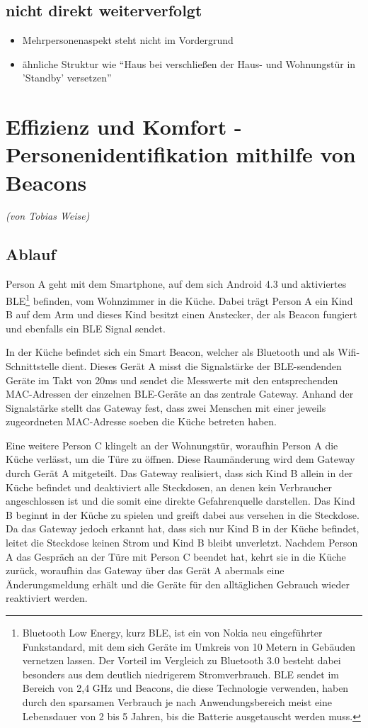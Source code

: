 \subsection{nicht direkt weiterverfolgt}
\begin{itemize}
	\item Mehrpersonenaspekt steht nicht im Vordergrund
	\item ähnliche Struktur wie "`Haus bei verschließen der Haus- und Wohnungstür in 'Standby' versetzen"'
\end{itemize}


\section{Effizienz und Komfort - Personenidentifikation mithilfe von Beacons}
\emph{(von Tobias Weise)}

\subsection{Ablauf}
Person A geht mit dem Smartphone, auf dem sich Android 4.3 und aktiviertes BLE\footnote{
	Bluetooth Low Energy, kurz BLE, ist ein von Nokia neu eingeführter Funkstandard, mit dem sich Geräte im Umkreis von 10 Metern in Gebäuden vernetzen lassen. Der Vorteil im Vergleich zu Bluetooth 3.0 besteht dabei besonders aus dem deutlich niedrigerem Stromverbrauch. BLE sendet im Bereich von 2,4 GHz und Beacons, die diese Technologie verwenden, haben durch den sparsamen Verbrauch je nach Anwendungsbereich meist eine Lebensdauer von 2 bis 5 Jahren, bis die Batterie ausgetauscht werden muss.} 
befinden, vom Wohnzimmer in die Küche. Dabei trägt Person A ein Kind B auf dem Arm und dieses Kind besitzt einen Anstecker, der als Beacon fungiert und ebenfalls ein BLE Signal sendet.

In der Küche befindet sich ein Smart Beacon, welcher als Bluetooth und als Wifi-Schnittstelle dient. Dieses Gerät A misst die Signalstärke der BLE-sendenden Geräte im Takt von 20ms und sendet die Messwerte mit den entsprechenden MAC-Adressen der einzelnen BLE-Geräte an das zentrale Gateway. Anhand der Signalstärke stellt das Gateway fest, dass zwei Menschen mit einer jeweils zugeordneten MAC-Adresse soeben die Küche betreten haben.

Eine weitere Person C klingelt an der Wohnungstür, woraufhin Person A die Küche verlässt, um die Türe zu öffnen. Diese Raumänderung wird dem Gateway durch Gerät A mitgeteilt. Das Gateway realisiert, dass sich Kind B allein in der Küche befindet und deaktiviert alle Steckdosen, an denen kein Verbraucher angeschlossen ist und die somit eine direkte Gefahrenquelle darstellen. 
Das Kind B beginnt in der Küche zu spielen und greift dabei aus versehen in die Steckdose. Da das Gateway jedoch erkannt hat, dass sich nur Kind B in der Küche befindet, leitet die Steckdose keinen Strom und Kind B bleibt unverletzt.
Nachdem Person A das Gespräch an der Türe mit Person C beendet hat, kehrt sie in die Küche zurück, woraufhin das Gateway über das Gerät A abermals eine Änderungsmeldung erhält und die Geräte für den alltäglichen Gebrauch wieder reaktiviert werden.

